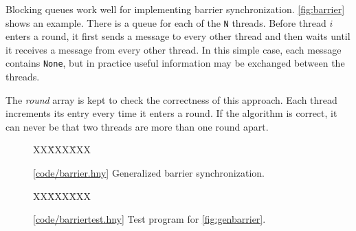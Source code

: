 \documentclass{report}
\newcommand{\harmonysource}[1]{
\begin{tabbing}
XX\=XXX\=XXX\kill
    
\end{tabbing}
}
\newcommand{\harmonylink}[1]{%
[\href{https://harmony.cs.cornell.edu/#1}{\underline{#1}}]%
}
\newenvironment{code}{
\tcolorbox
}{
\endtcolorbox
}
\begin{document}

Blocking queues work well for implementing barrier synchronization.
\autoref{fig:barrier} shows an example.  There is a queue
for each of the \texttt{N} threads.
Before thread $i$ enters a round, it first sends a message to every
other thread and then waits until it receives a message from
every other thread.
In this simple case, each message contains \texttt{None}, but in practice useful
information may be exchanged between the threads.

The \textit{round} array is kept to check the correctness of this
approach.  Each thread increments its entry every time it enters
a round.  If the algorithm is correct, it can never be that two threads
are more than one round apart.

\begin{figure}
\begin{code}
\harmonysource{barrier}
\end{code}
\caption{\harmonylink{code/barrier.hny} Generalized barrier synchronization.}
\label{fig:genbarrier}
\end{figure}

\begin{figure}
\begin{code}
\harmonysource{barriertest}
\end{code}
\caption{\harmonylink{code/barriertest.hny} Test program for \autoref{fig:genbarrier}.}
\label{fig:barriertest}
\end{figure}
\end{document}
